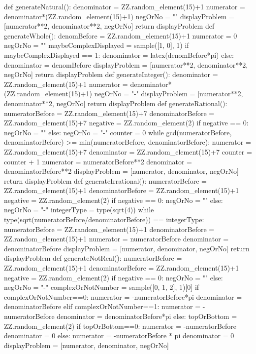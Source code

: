 \documentclass{ximera}
\begin{document}
\begin{sagesilent}
def generateNatural():
	denominator = ZZ.random_element(15)+1
	numerator = denominator*(ZZ.random_element(15)+1)
	negOrNo = ""
	displayProblem = [numerator**2, denominator**2, negOrNo]
	return displayProblem
def generateWhole():
	denomBefore = ZZ.random_element(15)+1
	numerator = 0
	negOrNo = ""
	maybeComplexDisplayed = sample([1, 0], 1)
	if maybeComplexDisplayed == 1:
        denominator = latex(denomBefore*pi)
	else:
        denominator = denomBefore
	displayProblem = [numerator**2, denominator**2, negOrNo]
	return displayProblem
def generateInteger():
    denominator = ZZ.random_element(15)+1
	numerator = denominator*(ZZ.random_element(15)+1)
	negOrNo = "-"
	displayProblem = [numerator**2, denominator**2, negOrNo]
	return displayProblem
def generateRational():
	numeratorBefore = ZZ.random_element(15)+7
	denominatorBefore = ZZ.random_element(15)+7
	negative = ZZ.random_element(2)
	if negative == 0:
	    negOrNo = ""
	else:
	    negOrNo = "-"
	counter = 0
	while gcd(numeratorBefore, denominatorBefore) >= min(numeratorBefore, denominatorBefore):
	    numerator = ZZ.random_element(15)+7
	    denominator = ZZ.random_element(15)+7
	    counter = counter + 1
	numerator = numeratorBefore**2
	denominator = denominatorBefore**2
	displayProblem = [numerator, denominator, negOrNo]
	return displayProblem
def generateIrrational():
	numeratorBefore = ZZ.random_element(15)+1
	denominatorBefore = ZZ.random_element(15)+1
	negative = ZZ.random_element(2)
	if negative == 0:
	    negOrNo = ""
	else:
	    negOrNo = "-"
	integerType = type(sqrt(4))
	while type(sqrt(numeratorBefore/denominatorBefore)) == integerType:
	    numeratorBefore = ZZ.random_element(15)+1
	    denominatorBefore = ZZ.random_element(15)+1
	numerator = numeratorBefore
	denominator = denominatorBefore
	displayProblem = [numerator, denominator, negOrNo]
	return displayProblem
def generateNotReal():
	numeratorBefore = ZZ.random_element(15)+1
	denominatorBefore = ZZ.random_element(15)+1
	negative = ZZ.random_element(2)
	if negative == 0:
	    negOrNo = ""
	else:
	    negOrNo = "-"
	complexOrNotNumber = sample([0, 1, 2], 1)[0]
	if complexOrNotNumber==0:
	    numerator = -numeratorBefore*pi
	    denominator = denominatorBefore
	elif complexOrNotNumber==1:
	    numerator = -numeratorBefore
	    denominator = denominatorBefore*pi
	else:
	    topOrBottom = ZZ.random_element(2)
	    if topOrBottom==0:
	        numerator = -numeratorBefore
	        denominator = 0
	    else:
	        numerator = -numeratorBefore * pi
	        denominator = 0
	displayProblem = [numerator, denominator, negOrNo]

\end{sagesilent}
\end{document}
